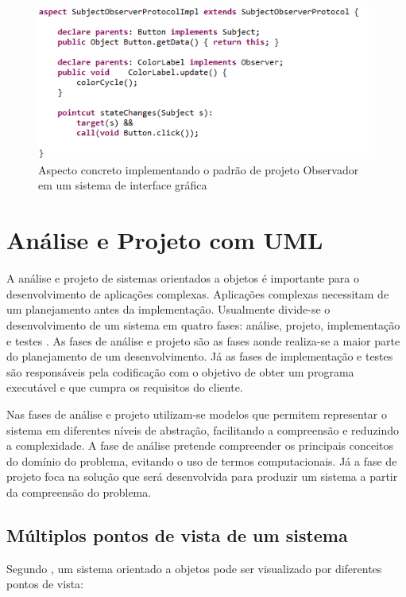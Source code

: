 \begin{figure}
	\centering
	\includegraphics{img/aspects_observer_2.png}
	\caption{Aspecto concreto implementando o padrão de projeto Observador em um sistema de
	interface gráfica}\label{fig:aspects_observer_2}
\end{figure}

\section{Análise e Projeto com UML}

A análise e projeto de sistemas orientados a objetos é importante para o
desenvolvimento de aplicações complexas. Aplicações complexas necessitam de um
planejamento antes da implementação. Usualmente divide-se o desenvolvimento de
um sistema em quatro fases: análise, projeto, implementação e testes
\cite{pressman:01}. As fases de análise e projeto são as fases aonde realiza-se 
a maior parte do planejamento de um desenvolvimento. Já as fases de
implementação e testes são responsáveis pela codificação com o objetivo de obter
um programa executável e que cumpra os requisitos do cliente. 

Nas fases de análise e projeto utilizam-se modelos que permitem representar o
sistema em diferentes níveis de abstração, facilitando a compreensão e reduzindo
a complexidade. A fase de análise pretende compreender os principais conceitos
do domínio do problema, evitando o uso de termos computacionais. Já a fase de
projeto foca na solução que será desenvolvida para produzir um sistema a partir
da compreensão do problema. 

\subsection{Múltiplos pontos de vista de um sistema}

Segundo \cite{silva:07}, um sistema orientado a objetos pode ser visualizado por
diferentes pontos de vista:

